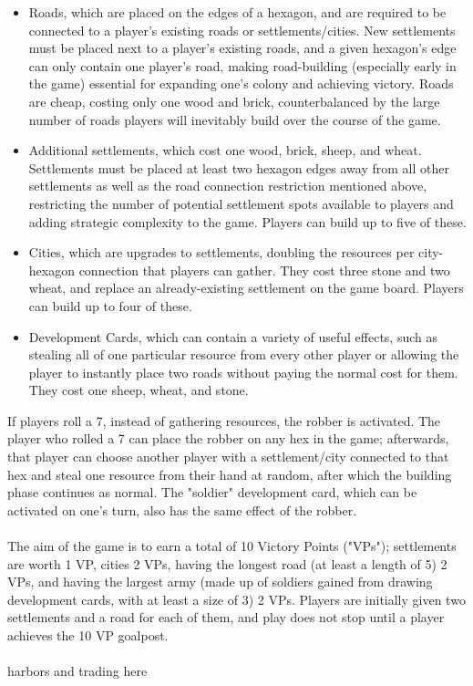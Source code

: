 \documentclass[a4paper, 11pt]{article}
\begin{document}
\begin{itemize}
	\item Roads, which are placed on the edges of a hexagon, and are required to be connected to a player's existing roads or settlements/cities. New settlements must be placed next to a player's existing roads, and a given hexagon's edge can only contain one player's road, making road-building (especially early in the game) essential for expanding one's colony and achieving victory. Roads are cheap, costing only one wood and brick, counterbalanced by the large number of roads players will inevitably build over the course of the game.
	\item Additional settlements, which cost one wood, brick, sheep, and wheat. Settlements must be placed at least two hexagon edges away from all other settlements as well as the road connection restriction mentioned above, restricting the number of potential settlement spots available to players and adding strategic complexity to the game. Players can build up to five of these.
	\item Cities, which are upgrades to settlements, doubling the resources per city-hexagon connection that players can gather. They cost three stone and two wheat, and replace an already-existing settlement on the game board. Players can build up to four of these.
	\item Development Cards, which can contain a variety of useful effects, such as stealing all of one particular resource from every other player or allowing the player to instantly place two roads without paying the normal cost for them. They cost one sheep, wheat, and stone.
\end{itemize}

\noindent If players roll a 7, instead of gathering resources, the robber is activated. The player who rolled a 7 can place the robber on any hex in the game; afterwards, that player can choose another player with a settlement/city connected to that hex and steal one resource from their hand at random, after which the building phase continues as normal. The "soldier" development card, which can be activated on one's turn, also has the same effect of the robber.
\\ \\
\noindent The aim of the game is to earn a total of 10 Victory Points ("VPs"); settlements are worth 1 VP, cities 2 VPs, having the longest road (at least a length of 5) 2 VPs, and having the largest army (made up of soldiers gained from drawing development cards, with at least a size of 3) 2 VPs. Players are initially given two settlements and a road for each of them, and play does not stop until a player achieves the 10 VP goalpost.
\\ \\
\noindent harbors and trading here
\end{document}
